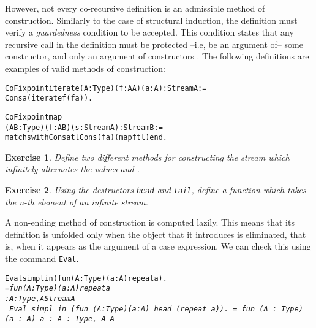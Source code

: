 \documentclass[11pt]{article}
\newtheorem{exercise}{Exercise}[section]
\begin{document}
However, not every co-recursive definition is an admissible method of
construction. Similarly to the case of structural induction, the
definition must verify a \textsl{guardedness} condition to be
accepted. This condition states that any recursive call in the
definition must be protected --i.e, be an argument of-- some
constructor, and only an argument of constructors \cite{EG94a}. The
following definitions are examples of valid methods of construction:

\begin{alltt}
CoFixpoint iterate (A: Type)(f: A {\arrow} A)(a : A) : Stream A:=
    Cons a (iterate f (f a)).

CoFixpoint map
  (A B:Type)(f: A {\arrow} B)(s : Stream A) : Stream B:=
  match s with Cons a tl {\funarrow} Cons (f a) (map f tl) end.
\end{alltt}

\begin{exercise}
Define two different methods for constructing the stream which
infinitely alternates the values  and .
\end{exercise}
\begin{exercise}
Using the destructors \texttt{head} and \texttt{tail}, define a function
which takes the n-th element of an infinite stream.
\end{exercise}

A non-ending method of construction is computed lazily. This means
that its definition is unfolded only when the object that it
introduces is eliminated, that is, when it appears as the argument of
a case expression. We can check this using the command
\texttt{Eval}.

\begin{alltt}
Eval simpl in (fun (A:Type)(a:A) {\funarrow} repeat a).
\it  = fun (A : Type) (a : A) {\funarrow} repeat a
     : {\prodsym} A : Type, A {\arrow} Stream A
\tt
Eval simpl in (fun (A:Type)(a:A) {\funarrow} head (repeat a)).
\it  = fun (A : Type) (a : A) {\funarrow} a
     : {\prodsym} A : Type, A {\arrow} A
\end{alltt}

\end{document}
